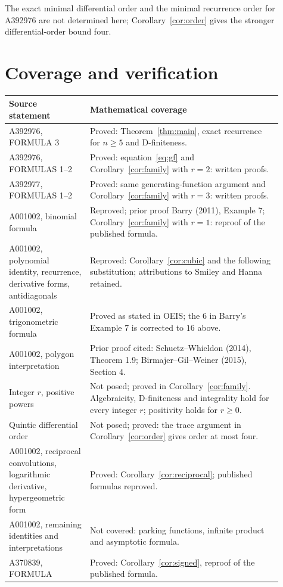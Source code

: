 \documentclass[10pt]{article}
\begin{document}
The exact minimal differential order and the minimal recurrence order
for A392976 are not determined here; Corollary~\ref{cor:order} gives
the stronger differential-order bound four.

\section{Coverage and verification}

\begin{center}
\small
\begin{tabular}{@{}p{0.27\linewidth}p{0.64\linewidth}@{}}
\toprule
Source statement & Mathematical coverage\\
\midrule
A392976, FORMULA 3 & Proved: Theorem~\ref{thm:main}, exact recurrence for $n\geq5$
and D-finiteness.\\
A392976, FORMULAS 1--2 & Proved: equation~\eqref{eq:gf} and
Corollary~\ref{cor:family} with $r=2$: written proofs.\\
A392977, FORMULAS 1--2 & Proved: same generating-function argument and
Corollary~\ref{cor:family} with $r=3$: written proofs.\\
A001002, binomial formula & Reproved; prior proof Barry (2011), Example 7;
Corollary~\ref{cor:family} with $r=1$:
reproof of the published formula.\\
A001002, polynomial identity, recurrence, derivative forms, antidiagonals
& Reproved: Corollary~\ref{cor:cubic} and the following substitution;
attributions to Smiley and Hanna retained.\\
A001002, trigonometric formula & Proved as stated in OEIS; the $6$ in
Barry's Example 7 is corrected to $16$ above.\\
A001002, polygon interpretation & Prior proof cited:
Schuetz--Whieldon (2014), Theorem 1.9; Birmajer--Gil--Weiner (2015), Section 4.\\
Integer $r$, positive powers & Not posed; proved in
Corollary~\ref{cor:family}. Algebraicity, D-finiteness and integrality
hold for every integer $r$; positivity holds for $r\geq0$.\\
Quintic differential order & Not posed; proved: the trace argument in
Corollary~\ref{cor:order} gives order at most four.\\
A001002, reciprocal convolutions, logarithmic derivative, hypergeometric form
& Proved: Corollary~\ref{cor:reciprocal}; published formulas reproved.\\
A001002, remaining identities and interpretations & Not covered:
parking functions, infinite product and asymptotic formula.\\
A370839, FORMULA & Proved: Corollary~\ref{cor:signed},
reproof of the published formula.\\
\bottomrule
\end{tabular}
\end{center}
\end{document}
